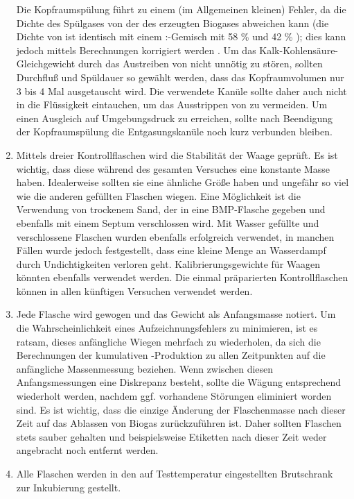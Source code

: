 \documentclass[]{article}
\begin{document}
\begin{enumerate}
{        Die Kopfraumspülung führt zu einem (im Allgemeinen kleinen) Fehler, da die Dichte des Spülgases von der des erzeugten Biogases abweichen kann (die Dichte von  ist identisch mit einem :-Gemisch mit 58 \%  und 42 \% ); dies kann jedoch mittels Berechnungen korrigiert werden \citep{justesenDevelopmentValidationLowcost2019}.
}
      Um das Kalk-Kohlensäure-Gleichgewicht durch das Austreiben von  nicht unnötig zu stören, sollten Durchfluß und Spüldauer so gewählt werden, dass das Kopfraumvolumen nur 3 bis 4 Mal ausgetauscht wird. Die verwendete Kanüle sollte daher auch nicht in die Flüssigkeit eintauchen, um das Ausstrippen von  zu vermeiden. Um einen Ausgleich auf Umgebungsdruck zu erreichen, sollte nach Beendigung der Kopfraumspülung die Entgasungskanüle noch kurz verbunden bleiben.
    \item Mittels dreier Kontrollflaschen wird die Stabilität der Waage geprüft. Es ist wichtig, dass diese während des gesamten Versuches eine konstante Masse haben. 
      Idealerweise sollten sie eine ähnliche Größe haben und ungefähr so viel wie die anderen gefüllten Flaschen wiegen.
      Eine Möglichkeit ist die Verwendung von trockenem Sand, der in eine BMP-Flasche gegeben und ebenfalls mit einem Septum verschlossen wird.
      Mit Wasser gefüllte und verschlossene Flaschen wurden ebenfalls erfolgreich verwendet, in manchen Fällen wurde jedoch festgestellt, dass eine kleine Menge an Wasserdampf durch Undichtigkeiten verloren geht.
      Kalibrierungsgewichte für Waagen könnten ebenfalls verwendet werden. Die einmal präparierten Kontrollflaschen können in allen künftigen Versuchen verwendet werden.
    \item Jede Flasche wird gewogen und das Gewicht als \glqq Anfangsmasse\grqq{} notiert.
      Um die Wahrscheinlichkeit eines Aufzeichnungsfehlers zu minimieren, ist es ratsam, dieses anfängliche Wiegen mehrfach zu wiederholen, da sich die Berechnungen der kumulativen -Produktion zu allen Zeitpunkten auf die anfängliche Massenmessung beziehen.
      Wenn zwischen diesen Anfangsmessungen eine Diskrepanz besteht, sollte die Wägung entsprechend wiederholt werden, nachdem ggf. vorhandene Störungen eliminiert worden sind.
      Es ist wichtig, dass die einzige Änderung der Flaschenmasse nach dieser Zeit auf das Ablassen von Biogas zurückzuführen ist.
      Daher sollten Flaschen stets sauber gehalten und beispielsweise Etiketten nach dieser Zeit weder angebracht noch entfernt werden.
    \item Alle Flaschen werden in den auf Testtemperatur eingestellten Brutschrank zur Inkubierung gestellt.
\end{enumerate}
\end{document}
